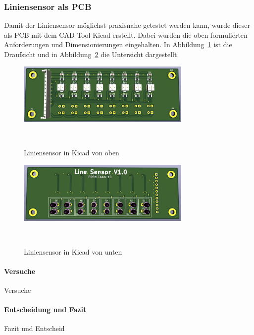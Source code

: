 \documentclass[main.tex]{subfiles} %
\begin{document}


\subsubsection{Liniensensor als PCB}

Damit der Liniensensor möglichst praxisnahe getestet 
werden kann, wurde dieser als PCB mit dem CAD-Tool Kicad erstellt. Dabei wurden die 
oben formulierten Anforderungen und Dimensionierungen eingehalten. In Abbildung~\ref{fig:Liniensensor_Top} 
ist die Draufsicht und in Abbildung~\ref{fig:Liniensensor_Bottom} die Untersicht dargestellt.

\begin{figure}[H]
    \centering
    \includegraphics[width=0.75\textwidth]{fig_Strecke_Tracken/Liniensensor_Top.pdf}
    \caption{Liniensensor in Kicad von oben}~\label{fig:Liniensensor_Top}
\end{figure}

\begin{figure}[H]
    \centering
    \includegraphics[width=0.75\textwidth]{fig_Strecke_Tracken/Liniensensor_Bottom.pdf}
    \caption{Liniensensor in Kicad von unten}~\label{fig:Liniensensor_Bottom}
\end{figure}





\paragraph{Versuche}
Versuche

\paragraph{Entscheidung und Fazit}
Fazit und Entscheid
\end{document}
